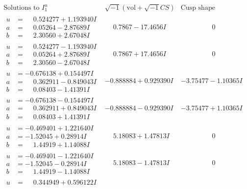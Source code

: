\documentclass[1p]{elsarticle_modified}
\theoremstyle{definition}
\newcommand{\I}{\sqrt{-1}}
\begin{document}
$$\begin{array}{c|c|c}
\text{Solutions to }I^u_{1}& \I (\text{vol} + \sqrt{-1}CS) & \text{Cusp shape}\\
 \hline 
\begin{aligned}
u &= \phantom{-}0.524277 + 1.193940 I \\
a &= \phantom{-}0.05264 - 2.87689 I \\
b &= \phantom{-}2.30560 + 2.67048 I\end{aligned}
 & \phantom{-}0.7867 - 17.4656 I & \phantom{-0.000000 } 0 \\ \hline\begin{aligned}
u &= \phantom{-}0.524277 - 1.193940 I \\
a &= \phantom{-}0.05264 + 2.87689 I \\
b &= \phantom{-}2.30560 - 2.67048 I\end{aligned}
 & \phantom{-}0.7867 + 17.4656 I & \phantom{-0.000000 } 0 \\ \hline\begin{aligned}
u &= -0.676138 + 0.154497 I \\
a &= \phantom{-}0.362911 - 0.849043 I \\
b &= \phantom{-}0.08403 - 1.41391 I\end{aligned}
 & -0.888884 + 0.929390 I & -3.75477 - 1.10365 I \\ \hline\begin{aligned}
u &= -0.676138 - 0.154497 I \\
a &= \phantom{-}0.362911 + 0.849043 I \\
b &= \phantom{-}0.08403 + 1.41391 I\end{aligned}
 & -0.888884 - 0.929390 I & -3.75477 + 1.10365 I \\ \hline\begin{aligned}
u &= -0.469401 + 1.221640 I \\
a &= -1.52045 + 0.28914 I \\
b &= \phantom{-}1.44919 + 1.14088 I\end{aligned}
 & \phantom{-}5.18083 + 1.47813 I & \phantom{-0.000000 } 0 \\ \hline\begin{aligned}
u &= -0.469401 - 1.221640 I \\
a &= -1.52045 - 0.28914 I \\
b &= \phantom{-}1.44919 - 1.14088 I\end{aligned}
 & \phantom{-}5.18083 - 1.47813 I & \phantom{-0.000000 } 0 \\ \hline\begin{aligned}
u &= \phantom{-}0.344949 + 0.596122 I \\

\end{aligned}
\end{array}$$
\end{document}
